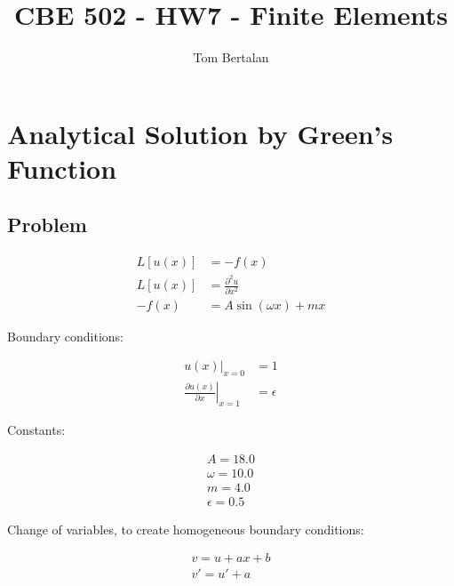 \documentclass[10pt]{article}
\title{CBE 502 - HW7 - Finite Elements}
\author{Tom Bertalan}
\begin{document}
\maketitle

\tableofcontents

\listoffigures

\section{Analytical Solution by Green's Function}
\label{sec:green}

\subsection{Problem}

\begin{equation}
    \label{eqn:problem}
    \begin{split}
        L[u(x)] &= -f(x) \\
        L[u(x)] &=  \frac{\partial^2 u}{\partial x^2} \\
        -f(x) &= A \sin (\omega x) + m x
    \end{split}
\end{equation}

Boundary conditions:

\begin{equation}
    \begin{split}
        \left. u(x) \right| _{x=0} &= 1 \\
        \left. \frac{\partial u(x)}{\partial x}\right|_{x=1} &= \epsilon
    \end{split}
\end{equation}

Constants:

\begin{equation}
    \label{eqn:constants}
    \begin{split}
        A = 18.0 \\
        \omega = 10.0 \\
        m = 4.0 \\
        \epsilon = 0.5
    \end{split}
\end{equation}


Change of variables, to create homogeneous boundary conditions:

\begin{equation}
    \label{eqn:changeofvars}
    \begin{split}
        v = u + a x + b \\
        v' = u' + a \\
    \end{split}
\end{equation}
\end{document}
